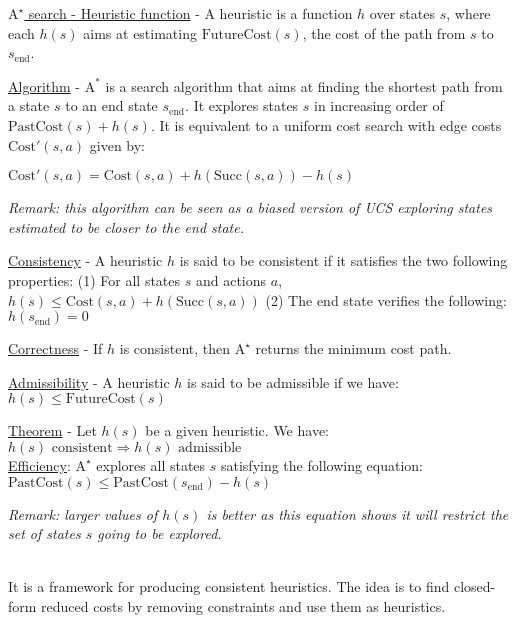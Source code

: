 \documentclass[4pt,landscape]{article}
\begin{document}
\begin{multicols*}{4}
{\underline{$\textrm{A}^{\star}$ search - Heuristic function} - A heuristic is a function $h$ over states $s$, where each $h(s)$ aims at estimating $\textrm{FutureCost}(s)$, the cost of the path from $s$ to $s_\textrm{end}$.}\par

{\underline{Algorithm} - $\textrm{A}^{*}$ is a search algorithm that aims at finding the shortest path from a state $s$ to an end state $s_\textrm{end}$. It explores states $s$ in increasing order of $\textrm{PastCost}(s) + h(s)$. It is equivalent to a uniform cost search with edge costs $\textrm{Cost}'(s,a)$ given by:}\par

${\textrm{Cost}'(s,a)=\textrm{Cost}(s,a)+h(\textrm{Succ}(s,a))-h(s)}$

{\textit{Remark: this algorithm can be seen as a biased version of UCS exploring states estimated to be closer to the end state.}}\par

{\underline{Consistency} - A heuristic $h$ is said to be consistent if it satisfies the two following properties:
(1) \tiny For all states $s$ and actions $a$, ${h(s) \leqslant \textrm{Cost}(s,a)+h(\textrm{Succ}(s,a))}$
(2) \tiny The end state verifies the following: ${h(s_{\textrm{end}})=0}$}\par

{\underline{Correctness} - If $h$ is consistent, then $\textrm{A}^\star$ returns the minimum cost path.}\par

{\underline{Admissibility} - A heuristic $h$ is said to be admissible if we have:${h(s)\leqslant\textrm{FutureCost}(s)}$}\par

{\underline{Theorem} - Let $h(s)$ be a given heuristic. We have: ${h(s)\textrm{ consistent}\Longrightarrow h(s)\textrm{ admissible}}$}\\

{\tiny \underline{Efficiency}: $\textrm{A}^\star$ explores all states $s$ satisfying the following equation: ${\textrm{PastCost}(s)\leqslant\textrm{PastCost}(s_{\textrm{end}})-h(s)}$}\par

{\textit{Remark: larger values of $h(s)$ is better as this equation shows it will restrict the set of states $s$ going to be explored.}}\par

{\color{cyan} \hrulefill}\\
{It is a framework for producing consistent heuristics. The idea is to find closed-form reduced costs by removing constraints and use them as heuristics.}\par


\end{multicols*}
\end{document}
